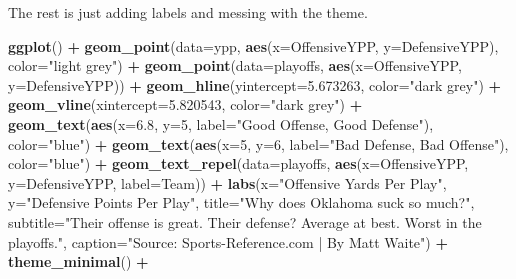\documentclass[
]{book}
\newenvironment{Shaded}{\begin{snugshade}}{\end{snugshade}}
\newcommand{\DataTypeTok}[1]{\textcolor[rgb]{0.13,0.29,0.53}{#1}}
\newcommand{\DecValTok}[1]{\textcolor[rgb]{0.00,0.00,0.81}{#1}}
\newcommand{\FloatTok}[1]{\textcolor[rgb]{0.00,0.00,0.81}{#1}}
\newcommand{\KeywordTok}[1]{\textcolor[rgb]{0.13,0.29,0.53}{\textbf{#1}}}
\newcommand{\NormalTok}[1]{#1}
\newcommand{\OperatorTok}[1]{\textcolor[rgb]{0.81,0.36,0.00}{\textbf{#1}}}
\newcommand{\StringTok}[1]{\textcolor[rgb]{0.31,0.60,0.02}{#1}}
\begin{document}
The rest is just adding labels and messing with the theme.

\begin{Shaded}
\begin{Highlighting}[]
\KeywordTok{ggplot}\NormalTok{() }\OperatorTok{+}\StringTok{ }
\StringTok{  }\KeywordTok{geom_point}\NormalTok{(}\DataTypeTok{data=}\NormalTok{ypp, }\KeywordTok{aes}\NormalTok{(}\DataTypeTok{x=}\NormalTok{OffensiveYPP, }\DataTypeTok{y=}\NormalTok{DefensiveYPP), }\DataTypeTok{color=}\StringTok{"light grey"}\NormalTok{) }\OperatorTok{+}
\StringTok{  }\KeywordTok{geom_point}\NormalTok{(}\DataTypeTok{data=}\NormalTok{playoffs, }\KeywordTok{aes}\NormalTok{(}\DataTypeTok{x=}\NormalTok{OffensiveYPP, }\DataTypeTok{y=}\NormalTok{DefensiveYPP)) }\OperatorTok{+}
\StringTok{  }\KeywordTok{geom_hline}\NormalTok{(}\DataTypeTok{yintercept=}\FloatTok{5.673263}\NormalTok{, }\DataTypeTok{color=}\StringTok{"dark grey"}\NormalTok{) }\OperatorTok{+}\StringTok{ }
\StringTok{  }\KeywordTok{geom_vline}\NormalTok{(}\DataTypeTok{xintercept=}\FloatTok{5.820543}\NormalTok{, }\DataTypeTok{color=}\StringTok{"dark grey"}\NormalTok{) }\OperatorTok{+}\StringTok{ }
\StringTok{  }\KeywordTok{geom_text}\NormalTok{(}\KeywordTok{aes}\NormalTok{(}\DataTypeTok{x=}\FloatTok{6.8}\NormalTok{, }\DataTypeTok{y=}\DecValTok{5}\NormalTok{, }\DataTypeTok{label=}\StringTok{"Good Offense, Good Defense"}\NormalTok{), }\DataTypeTok{color=}\StringTok{"blue"}\NormalTok{) }\OperatorTok{+}
\StringTok{  }\KeywordTok{geom_text}\NormalTok{(}\KeywordTok{aes}\NormalTok{(}\DataTypeTok{x=}\DecValTok{5}\NormalTok{, }\DataTypeTok{y=}\DecValTok{6}\NormalTok{, }\DataTypeTok{label=}\StringTok{"Bad Defense, Bad Offense"}\NormalTok{), }\DataTypeTok{color=}\StringTok{"blue"}\NormalTok{) }\OperatorTok{+}
\StringTok{  }\KeywordTok{geom_text_repel}\NormalTok{(}\DataTypeTok{data=}\NormalTok{playoffs, }\KeywordTok{aes}\NormalTok{(}\DataTypeTok{x=}\NormalTok{OffensiveYPP, }\DataTypeTok{y=}\NormalTok{DefensiveYPP, }\DataTypeTok{label=}\NormalTok{Team)) }\OperatorTok{+}
\StringTok{  }\KeywordTok{labs}\NormalTok{(}\DataTypeTok{x=}\StringTok{"Offensive Yards Per Play"}\NormalTok{, }\DataTypeTok{y=}\StringTok{"Defensive Points Per Play"}\NormalTok{, }\DataTypeTok{title=}\StringTok{"Why does Oklahoma suck so much?"}\NormalTok{, }\DataTypeTok{subtitle=}\StringTok{"Their offense is great. Their defense? Average at best. Worst in the playoffs."}\NormalTok{, }\DataTypeTok{caption=}\StringTok{"Source: Sports-Reference.com | By Matt Waite"}\NormalTok{) }\OperatorTok{+}
\StringTok{  }\KeywordTok{theme_minimal}\NormalTok{() }\OperatorTok{+}\StringTok{ }

\end{Highlighting}
\end{Shaded}
\end{document}
